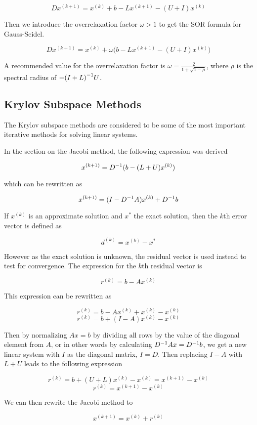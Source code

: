 $$ Dx^{(k+1)} = x^{(k)} + b - Lx^{(k+1)} - (U + I)x^{(k)} $$

Then we introduce the overrelaxation factor $\omega > 1$ to get the SOR formula 
for Gauss-Seidel.

$$ Dx^{(k+1)} = x^{(k)} + \omega \big( b - Lx^{(k+1)} - (U + I)x^{(k)} \big) $$

A recommended value for the overrelaxation factor is $\omega = \frac{2}{1 +
\sqrt{1 - \rho}} $, where $\rho$ is the spectral radius of $-{(I + L)}^{-1}U$\cite{Kreyszig}. 

\subsection{Krylov Subspace Methods}

The Krylov subspace methods are considered to be some of the most important iterative 
methods for solving linear systems.

In the section on the Jacobi method, the following expression was derived

$$ x^{(k+1)} = {D}^{-1}(b - (L+U)x^{(k)}) $$

which can be rewritten as 

$$ x^{(k+1)} = (I - {D}^{-1}A)x^{(k)} + {D}^{-1}b $$

If $x^{(k)}$ is an approximate solution and $x^{*}$ the exact solution, then the 
$k$th error vector is defined as 

$$ d^{(k)} = x^{(k)} - x^{*}$$

However as the exact solution is unknown, the residual vector is used instead 
to test for convergence. The expression for the $k$th residual vector is

$$ r^{(k)} = b - Ax^{(k)} $$

This expression can be rewritten as

$$ r^{(k)} = b - Ax^{(k)} + x^{(k)} - x^{(k)}$$
$$ r^{(k)} = b + (I - A)x^{(k)} - x^{(k)}$$

Then by normalizing $Ax = b$ by dividing all rows by the value of the diagonal element 
from $A$, or in other words by calculating ${D}^{-1}Ax = {D}^{-1}b$, we get a new linear 
system with $I$ as the diagonal matrix, $I = D$. Then replacing $I-A$ with $L+U$ 
leads to the following expression

$$ r^{(k)} = b + (U+L)x^{(k)} - x^{(k)} = x^{(k+1)} - x^{(k)}$$
$$ r^{(k)} = x^{(k+1)} - x^{(k)} $$

We can then rewrite the Jacobi method to

$$ x^{(k+1)} = x^{(k)} + r^{(k)} $$

